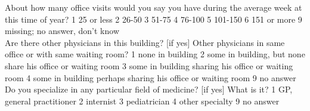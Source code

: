 \documentclass[11pt]{article}
\begin{document}
About how many office visits would you say you have during the average week at this time of year?
1 25 or less 
2 26-50 
3 51-75 
4 76-100 
5 101-150 
6 151 or more
9 missing; no answer, don't know\\

Are there other physicians in this building? [if yes] Other physicians in same office or with same waiting room? 
1 none in building 
2 some in building, but none share his office or waiting room 
3 some in building sharing his office or waiting room 
4 some in building perhaps sharing his office or waiting room 
9 no answer\\

Do you specialize in any particular field of medicine? [if yes] What is it? 
1 GP, general practitioner 
2 internist 
3 pediatrician 
4 other specialty 
9 no answer\\
\end{document}
